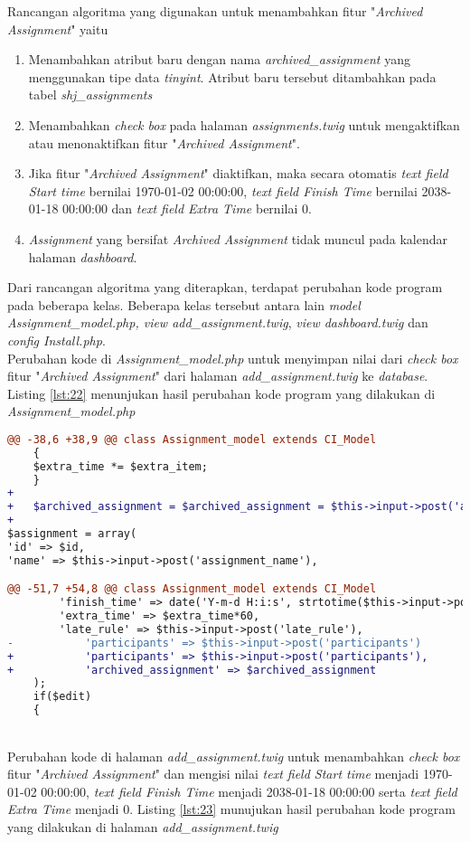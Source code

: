 Rancangan algoritma yang digunakan untuk menambahkan fitur "\textit{Archived Assignment}" yaitu
\begin{enumerate}
	\item Menambahkan atribut baru dengan nama \textit{archived\_assignment} yang menggunakan tipe data \textit{tinyint}. Atribut baru tersebut ditambahkan pada tabel \textit{shj\_assignments}
	\item Menambahkan \textit{check box} pada halaman \textit{assignments.twig} untuk mengaktifkan atau menonaktifkan fitur "\textit{Archived Assignment}".
	\item Jika fitur "\textit{Archived Assignment}" diaktifkan, maka secara otomatis \textit{text field Start time} bernilai 1970-01-02 00:00:00, \textit{text field Finish Time} bernilai 2038-01-18 00:00:00 dan \textit{text field Extra Time} bernilai 0.
	\item \textit{Assignment} yang bersifat \textit{Archived Assignment} tidak muncul pada kalendar halaman \textit{dashboard}.
\end{enumerate}

Dari rancangan algoritma yang diterapkan, terdapat perubahan kode program pada beberapa kelas. Beberapa kelas tersebut antara lain \textit{model Assignment\_model.php, view add\_assignment.twig}, \textit{view dashboard.twig} dan \textit{config Install.php}.
~\\
Perubahan kode di \textit{Assignment\_model.php} untuk menyimpan nilai dari \textit{check box} fitur "\textit{Archived Assignment}" dari halaman \textit{add\_assignment.twig} ke \textit{database}. Listing \ref{lst:22} menunjukan hasil perubahan kode program yang dilakukan di \textit{Assignment\_model.php}

\begin{lstlisting}[language=diff, caption=Perubahan kode program pada \textit{Assignments\_model.php}, label=lst:22, basicstyle=\ttfamily, frame=single,
columns=fullflexible, keepspaces=true, breaklines=true]
@@ -38,6 +38,9 @@ class Assignment_model extends CI_Model
	{
	$extra_time *= $extra_item;
	}
+  
+   $archived_assignment = $archived_assignment = $this->input->post('archived_assignment')!==NULL ? 1 : 0;
+  
$assignment = array(
'id' => $id,
'name' => $this->input->post('assignment_name'),

@@ -51,7 +54,8 @@ class Assignment_model extends CI_Model
		'finish_time' => date('Y-m-d H:i:s', strtotime($this->input->post('finish_time'))),
		'extra_time' => $extra_time*60,
		'late_rule' => $this->input->post('late_rule'),
-       	'participants' => $this->input->post('participants')
+           'participants' => $this->input->post('participants'),
+           'archived_assignment' => $archived_assignment
	);
	if($edit)
	{
\end{lstlisting}
~\\
Perubahan kode di halaman \textit{add\_assignment.twig} untuk menambahkan \textit{check box} fitur "\textit{Archived Assignment}" dan  mengisi nilai \textit{text field Start time} menjadi 1970-01-02 00:00:00, \textit{text field Finish Time} menjadi 2038-01-18 00:00:00 serta \textit{text field Extra Time} menjadi 0. Listing \ref{lst:23} munujukan hasil perubahan kode program yang dilakukan di halaman \textit{add\_assignment.twig}

